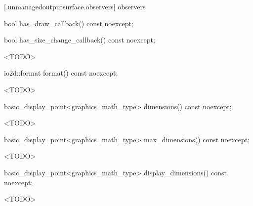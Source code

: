  [\iotwod.unmanagedoutputsurface.observers] { observers}

%
\begin{itemdecl}
bool has_draw_callback() const noexcept;
\end{itemdecl}
\begin{itemdescr}
\pnum
\returns {}
\end{itemdescr}

%
\begin{itemdecl}
bool has_size_change_callback() const noexcept;
\end{itemdecl}
\begin{itemdescr}
\pnum
\returns
<TODO>
\end{itemdescr}

%
\begin{itemdecl}
io2d::format format() const noexcept;
\end{itemdecl}
\begin{itemdescr}
\pnum
\returns
<TODO>
\end{itemdescr}

%
\begin{itemdecl}
basic_display_point<graphics_math_type> dimensions() const noexcept;
\end{itemdecl}
\begin{itemdescr}
\pnum
\returns
<TODO>
\end{itemdescr}

%
\begin{itemdecl}
basic_display_point<graphics_math_type> max_dimensions() const noexcept;
\end{itemdecl}
\begin{itemdescr}
\pnum
\returns
<TODO>
\end{itemdescr}

%
\begin{itemdecl}
basic_display_point<graphics_math_type> display_dimensions() const noexcept;
\end{itemdecl}
\begin{itemdescr}
\pnum
\returns
<TODO>
\end{itemdescr}

